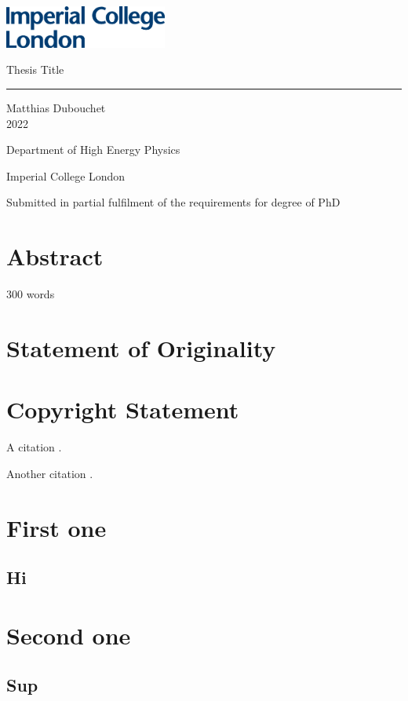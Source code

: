 \documentclass[11pt, a4paper, twoside]{report}
\begin{document}
\includegraphics[width=0.4\textwidth]{IMP_ML_1CS_4CP.eps}
\vfill
\begin{center}
    
    {\huge Thesis Title}
    
    \rule{7cm}{1pt}
    \vspace{2cm}
    
    Matthias Dubouchet\\
    2022
    \vspace{2cm}
    
    Department of High Energy Physics
    
    Imperial College London
    \vspace{2cm}
    
    Submitted in partial fulfilment of the requirements for degree of PhD
    
\end{center}

\vfill
\clearpage

\tableofcontents
\listoffigures
\listoftables
\printglossary[type=\acronymtype]

\chapter*{Abstract}

300 words

\blindtext

\chapter*{Statement of Originality}
\blindtext

\chapter*{Copyright Statement}








A citation \cite{butter_how_2019}.

Another citation \cite{butter_how_2019}.

\appendix
\chapter{First one}
\section{Hi}
\chapter{Second one}
\section{Sup}

\printbibliography
\end{document}
